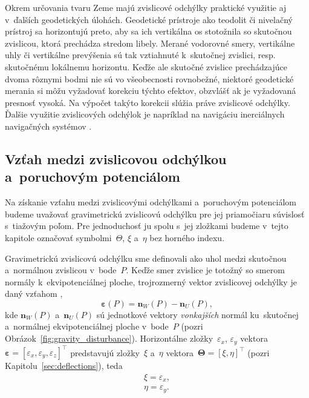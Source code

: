 \documentclass[a4paper,12pt]{book}
\let\vec\mathbf
\begin{document}
Okrem určovania tvaru Zeme majú zvislicové odchýlky praktické využitie aj 
v~ďalších geodetických úlohách.  Geodetické prístroje ako teodolit či nivelačný 
prístroj sa horizontujú preto, aby sa ich vertikálna os stotožnila so skutočnou 
zvislicou, ktorá prechádza stredom libely.  Merané vodorovné smery, vertikálne 
uhly či vertikálne prevýšenia sú tak vztiahnuté k~skutočnej zvislici, 
resp. skutočnému lokálnemu horizontu.  Keďže ale skutočné zvislice 
prechádzajúce dvoma rôznymi bodmi nie sú vo všeobecnosti rovnobežné, niektoré 
geodetické merania si môžu vyžadovať korekciu týchto efektov, obzvlášť ak je 
vyžadovaná presnosť vysoká.  Na výpočet takýto korekcii slúžia práve zvislicové 
odchýlky.  Ďalšie využitie zvislicových odchýlok je napríklad na navigáciu 
inerciálnych navigačných systémov \parencite[pozri napríklad][]{Jekeli2000}.


\subsection{Vzťah medzi zvislicovou odchýlkou a~poruchovým potenciálom}
\label{sec:deflections_disturbing_potential}

Na získanie vzťahu medzi zvislicovými odchýlkami a~poruchovým potenciálom 
budeme uvažovať gravimetrickú zvislicovú odchýlku pre jej priamočiaru súvislosť 
s~tiažovým poľom.  Pre jednoduchosť ju spolu s~jej zložkami budeme v~tejto 
kapitole označovať symbolmi~$\Theta$, $\xi$ a~$\eta$ bez horného indexu.

Gravimetrickú zvislicovú odchýlku sme definovali ako uhol medzi skutočnou 
a~normálnou zvislicou v~bode~$P$.  Keďže smer zvislice je totožný so smerom 
normály k~ekvipotenciálnej ploche, trojrozmerný vektor zvislicovej odchýlky je 
daný vzťahom \parencite{SansoGeoidDetermination},
%
\begin{equation}
\label{eq:deflection_eps}
\boldsymbol\varepsilon(P) = \vec n_W(P) - \vec n_U(P){,}
\end{equation}
%
kde $\vec n_W(P)$ a~$\vec n_U(P)$ sú jednotkové vektory \emph{vonkajších} 
normál ku~skutočnej a~normálnej ekvipotenciálnej ploche v~bode~$P$ (pozri 
Obrázok~\ref{fig:gravity_disturbance}).  Horizontálne zložky~$\varepsilon_x$, 
$\varepsilon_y$ vektora~$\boldsymbol\varepsilon = [\varepsilon_x, 
\varepsilon_y, \varepsilon_z]^\top$ predstavujú zložky~$\xi$ a~$\eta$ 
vektora~$\boldsymbol\Theta = [\xi, \eta]^\top$ (pozri 
Kapitolu~\ref{sec:deflections}), teda
%
\begin{equation}
\label{eq:xi_eta_eps}
\begin{split}
\xi = \varepsilon_x{,}\\
\eta = \varepsilon_y{.}
\end{split}
\end{equation}
\end{document}
